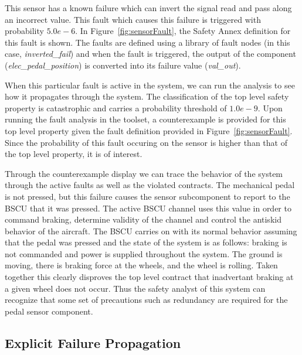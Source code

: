 This sensor has a known failure which can invert the signal read and pass along an incorrect value. This fault which causes this failure is triggered with probability $5.0e-6$. In Figure~\ref{fig:sensorFault}, the Safety Annex definition for this fault is shown. The faults are defined using a library of fault nodes (in this case, \textit{inverted\_fail}) and when the fault is triggered, the output of the component (\textit{elec\_pedal\_position}) is converted into its failure value (\textit{val\_out}). 

When this particular fault is active in the system, we can run the analysis to see how it propagates through the system. The classification of the top level safety property is catastrophic and carries a probability threshold of $1.0e-9$. Upon running the fault analysis in the toolset, a counterexample is provided for this top level property given the fault definition provided in Figure~\ref{fig:sensorFault}. Since the probability of this fault occuring on the sensor is higher than that of the top level property, it is of interest. 

Through the counterexample display we can trace the behavior of the system through the active faults as well as the violated contracts. The mechanical pedal is not pressed, but this failure causes the sensor subcomponent to report to the BSCU that it was pressed. The active BSCU channel uses this value in order to command braking, determine validity of the channel and control the antiskid behavior of the aircraft. The BSCU carries on with its normal behavior assuming that the pedal was pressed and the state of the system is as follows: braking is not commanded and power is supplied throughout the system. The ground is moving, there is braking force at the wheels, and the wheel is rolling. Taken together this clearly disproves the top level contract that inadvertant braking at a given wheel does not occur. Thus the safety analyst of this system can recognize that some set of precautions such as redundancy are required for the pedal sensor component. 

\subsection{Explicit Failure Propagation} 

